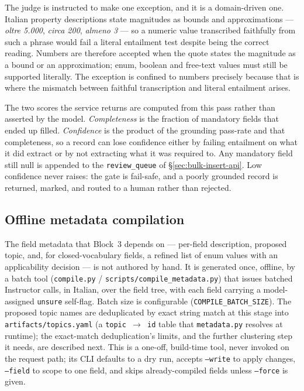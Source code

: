 The judge is instructed to make one exception, and it is a domain-driven one. Italian property descriptions state magnitudes as bounds and approximations — \emph{oltre 5.000}, \emph{circa 200}, \emph{almeno 3} — so a numeric value transcribed faithfully from such a phrase would fail a literal entailment test despite being the correct reading. Numbers are therefore accepted when the quote states the magnitude as a bound or an approximation; enum, boolean and free-text values must still be supported literally. The exception is confined to numbers precisely because that is where the mismatch between faithful transcription and literal entailment arises.

The two scores the service returns are computed from this pass rather than asserted by the model. \emph{Completeness} is the fraction of mandatory fields that ended up filled. \emph{Confidence} is the product of the grounding pass-rate and that completeness, so a record can lose confidence either by failing entailment on what it did extract or by not extracting what it was required to. Any mandatory field still null is appended to the \texttt{review\_queue} of \S\ref{sec:bulk-insert-api}. Low confidence never raises: the gate is fail-safe, and a poorly grounded record is returned, marked, and routed to a human rather than rejected.

\subsection{Offline metadata compilation}
\label{sec:bulk-insert-metadata-compile}

The field metadata that Block~3 depends on — per-field description, proposed topic, and, for closed-vocabulary fields, a refined list of enum values with an applicability decision — is not authored by hand. It is generated once, offline, by a batch tool (\texttt{compile.py} / \texttt{scripts/compile\_metadata.py}) that issues batched Instructor calls, in Italian, over the field tree, with each field carrying a model-assigned \texttt{unsure} self-flag. Batch size is configurable (\texttt{COMPILE\_BATCH\_SIZE}). The proposed topic names are deduplicated by exact string match at this stage into \texttt{artifacts/topics.yaml} (a \texttt{topic~$\to$~id} table that \texttt{metadata.py} resolves at runtime); the exact-match deduplication's limits, and the further clustering step it needs, are described next. This is a one-off, build-time tool, never invoked on the request path; its CLI defaults to a dry run, accepts \texttt{--write} to apply changes, \texttt{--field} to scope to one field, and skips already-compiled fields unless \texttt{--force} is given.

